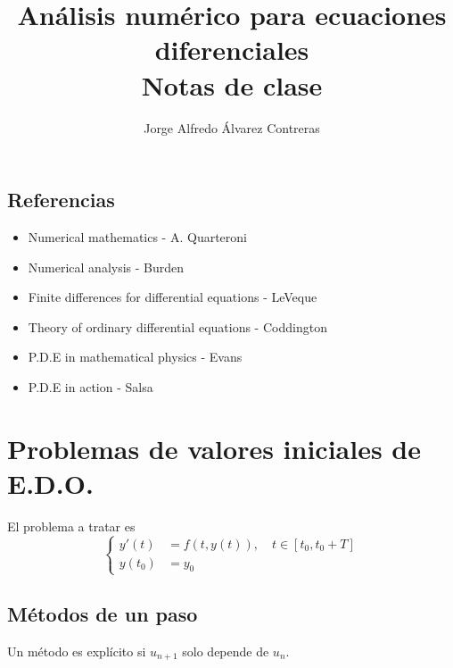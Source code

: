 \documentclass[11pt,letterpaper]{report}
\title{Análisis numérico para ecuaciones diferenciales
  \\ \vspace{5mm}
\large Notas de clase}
\author{Jorge Alfredo Álvarez Contreras}
\begin{document}
\maketitle
\tableofcontents

\section*{Referencias}

\begin{itemize}
  \item
    Numerical mathematics - A. Quarteroni
  \item
    Numerical analysis - Burden
  \item
    Finite differences for differential equations - LeVeque
  \item
    Theory of ordinary differential equations - Coddington
  \item
    P.D.E in mathematical physics - Evans
  \item
    P.D.E in action - Salsa
\end{itemize}

\chapter{Problemas de valores iniciales de E.D.O.}

El problema a tratar es
\begin{equation}
  \left\{
    \begin{aligned}
      y'(t) &= f(t,y(t)), \quad t \in [t_0,t_0+T]
      \\
      y(t_0) &= y_0
    \end{aligned}
  \right.
\end{equation}

\section{Métodos de un paso}

Un método es explícito si $u_{n+1}$ solo depende de $u_n$.
\end{document}
